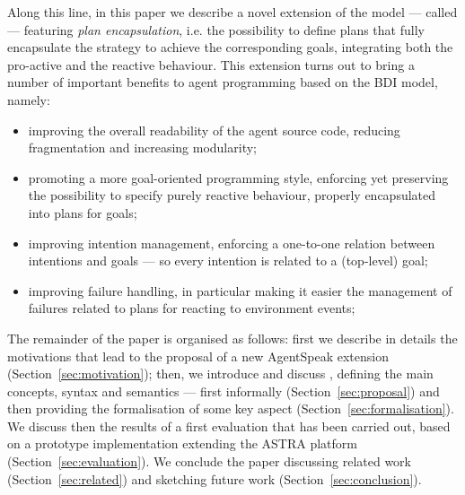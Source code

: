 %
Along this line, in this paper we describe a novel extension of the
{\asl} model --- called {\aser} --- featuring \emph{plan
  encapsulation}, i.e. the possibility to define plans that fully
encapsulate the strategy to achieve the corresponding goals,
integrating both the pro-active and the reactive behaviour.
%
%
This extension turns out to bring a number of important benefits to
agent programming based on the BDI model, namely:
%
\begin{itemize}
\item improving the overall readability of the agent source code,
  reducing fragmentation and increasing modularity;
\item promoting a more goal-oriented programming style, enforcing yet
  preserving the possibility to specify purely reactive behaviour,
  properly encapsulated into plans for goals;
\item improving intention management, enforcing a one-to-one relation
  between intentions and goals --- so every intention is related to a
  (top-level) goal;
\item improving failure handling, in particular making it easier the
  management of failures related to plans for reacting to environment
  events;
\end{itemize}
%

\noindent The remainder of the paper is organised as follows:
%
first we describe in details the motivations that lead to the proposal
of a new AgentSpeak extension (Section~\ref{sec:motivation});
%
then, we introduce and discuss {\aser}, defining the main concepts,
syntax and semantics --- first informally (Section~\ref{sec:proposal})
and then providing the formalisation of some key aspect
(Section~\ref{sec:formalisation}).
%
We discuss then the results of a first evaluation that has been
carried out, based on a prototype implementation extending the ASTRA
platform (Section~\ref{sec:evaluation}).
%
We conclude the paper discussing related work
(Section~\ref{sec:related}) and sketching future work
(Section~\ref{sec:conclusion}).


